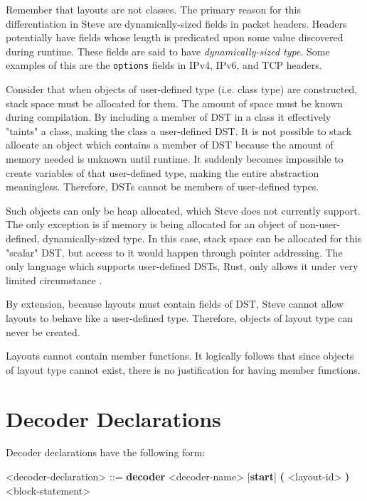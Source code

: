 Remember that layouts are not classes. The primary reason for this differentiation in Steve are dynamically-sized fields in packet headers. Headers potentially have fields whose length is predicated upon some value discovered during runtime. These fields are said to have \textit{dynamically-sized type}. Some examples of this are the \texttt{options} fields in IPv4, IPv6, and TCP headers.

Consider that when objects of user-defined type (i.e. class type) are constructed, stack space must be allocated for them. The amount of space must be known during compilation. By including a member of DST in a class it effectively "taints" a class, making the class a user-defined DST. It is not possible to stack allocate an object which contains a member of DST because the amount of memory needed is unknown until runtime. It suddenly becomes impossible to create variables of that user-defined type, making the entire abstraction meaningless. Therefore, DSTs cannot be members of user-defined types.

Such objects can only be heap allocated, which Steve does not currently support. The only exception is if memory is being allocated for an object of non-user-defined, dynamically-sized type. In this case, stack space can be allocated for this "scalar" DST, but access to it would happen through pointer addressing. The only language which supports user-defined DSTs, Rust, only allows it under very limited circumstance \cite{rust_dst_std}.

By extension, because layouts must contain fields of DST, Steve cannot allow layouts to behave like a user-defined type. Therefore, objects of layout type can never be created.

Layouts cannot contain member functions. It logically follows that since objects of layout type cannot exist, there is no justification for having member functions.

\section{Decoder Declarations} \label{guide:decoder}

Decoder declarations have the following form:

\begin{minip}
\begin{grammar}
\singlespace
<decoder-declaration> ::=
\textbf{decoder} <decoder-name> [\textbf{start}]
\textbf{(} <layout-id> \textbf{)}
<block-statement>
\end{grammar}
\end{minip}

